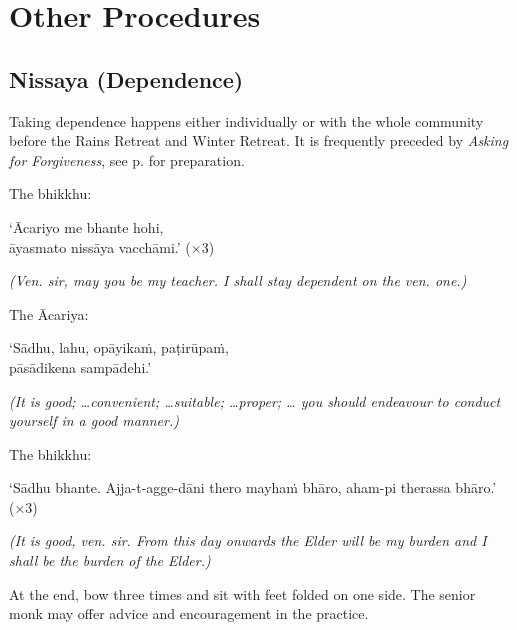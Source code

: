 \chapter{Other Procedures}

\section{Nissaya (Dependence)}
\label{nissaya}

Taking dependence happens either individually or with the whole community before
the Rains Retreat and Winter Retreat. It is frequently preceded by \emph{Asking
  for Forgiveness}, see p.\pageref{asking-forgiveness} for preparation.

The bhikkhu:

\vspace*{\parskip}

\begin{paritta}
  ‘Ācariyo me bhante hohi,\\
  āyasmato nissāya vacchāmi.’ (×3)
\end{paritta}

\emph{(Ven. sir, may you be my teacher. I shall stay dependent on the ven. one.)}

The Ācariya:

\vspace*{\parskip}

\begin{paritta}
  ‘Sādhu, lahu, opāyikaṁ, paṭirūpaṁ,\\
  pāsādikena sampādehi.’
\end{paritta}

\emph{(It is good; …convenient; …suitable; …proper; … you should endeavour to
  conduct yourself in a good manner.)} 

The bhikkhu:

\vspace*{\parskip}

\begin{paritta}
  ‘Sādhu bhante. Ajja-t-agge-dāni thero mayhaṁ bhāro, aham-pi therassa bhāro.’ (×3)
\end{paritta}

\emph{(It is good, ven. sir. From this day onwards the Elder will be my burden
  and I shall be the burden of the Elder.)} 

At the end, bow three times and sit with feet folded on one side. The senior
monk may offer advice and encouragement in the practice.

